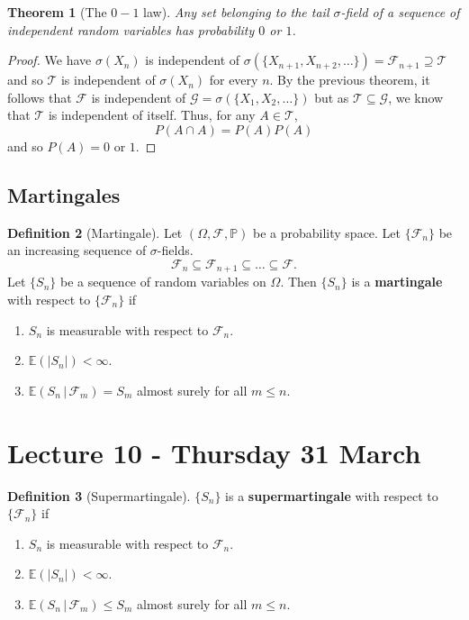 \documentclass[10pt, oneside, reqno]{amsart}
\theoremstyle{plain}%
\newtheorem{thm}{Theorem}[section]
\theoremstyle{definition}
\newtheorem{defn}[thm]{Definition}
\theoremstyle{remark}
\newcommand{\sigf}{\mathcal{F}}
\newcommand{\E}{\mathbb{E}}
\renewcommand{\P}{\mathbb{P}}
\begin{document}
\begin{thm}[The $0-1$ law]
    Any set belonging to the tail $\sigma$-field of a sequence of independent random variables has probability $0$ or $1$.      
\end{thm}   
\begin{proof}
    We have $\sigma(X_n)$ is independent of $\sigma( \{ X_{n+1}, X_{n+2}, \dots \}) = \sigf_{n+1} \supseteq \mathcal{T}$ and so $\mathcal{T}$ is independent of $\sigma(X_n)$ for every $n$.  By the previous theorem, it follows that $\sigf$ is independent of $\mathcal{G} = \sigma(\{ X_1, X_2, \dots \})$ but as $\mathcal{T} \subseteq \mathcal{G}$, we know that $\mathcal{T}$ is independent of itself.  Thus, for any $A \in \mathcal{T}$, \[
        P(A \cap A) = P(A) P(A)
    \] and so $P(A) = 0$ or $1$.  
\end{proof}

\subsection{Martingales} %
\label{sub:martingales}

\begin{defn}[Martingale]
    Let $(\Omega, \sigf, \P)$ be a probability space.  Let $\{ \sigf_n \}$ be an increasing sequence of $\sigma$-fields.  \[
        \sigf_n \subseteq \sigf_{n+1} \subseteq \dots \subseteq \sigf. 
    \]  Let $\{ S_n \}$ be a sequence of random variables on $\Omega$.  Then $\{ S_n \}$ is a \textbf{martingale} with respect to $\{ \sigf_n \}$ if 
    \begin{enumerate}[(1)]
        \item $S_n$ is measurable with respect to $\sigf_n$. 
        \item $\E(|S_n|) < \infty$.
        \item $\E(S_n \, | \, \sigf_m) = S_m$ almost surely for all $m \leq n$. 
    \end{enumerate}
\end{defn}


\section{Lecture 10 - Thursday 31 March} %
\label{sec:lecture_10_thursday_31_march}
\begin{defn}[Supermartingale]
$\{ S_n \}$ is a \textbf{supermartingale} with respect to $\{ \sigf_n \}$ if 
    \begin{enumerate}[(1)]
        \item $S_n$ is measurable with respect to $\sigf_n$. 
        \item $\E(|S_n|) < \infty$.
        \item $\E(S_n \, | \, \sigf_m) \leq S_m$ almost surely for all $m \leq n$. 
    \end{enumerate}
\end{defn}
\end{document}
